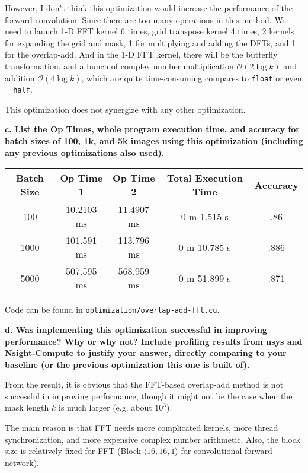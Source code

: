 \documentclass[12pt]{article}
\begin{document}
However, I don't think this optimization would increase the performance of the forward convolution. Since there are too many operations in this method. We need to launch 1-D FFT kernel 6 times, grid transpose kernel 4 times, 2 kernels for expanding the grid and mask, 1 for multiplying and adding the DFTs, and 1 for the overlap-add. And in the 1-D FFT kernel, there will be the butterfly transformation, and a bunch of complex number multiplication $\mathcal O(2 \log k)$ and addition $\mathcal O(4 \log k)$, which are quite time-consuming compares to \texttt{float} or even \texttt{\_\_half}.

This optimization does not synergize with any other optimization.

\hfill \break
\noindent \textbf{c. \; List the Op Times, whole program execution time, and accuracy for batch sizes of 100, 1k, and 5k images using this optimization (including any previous optimizations also used).}
\hfill \break

\begin{table}[!ht]
\begin{longtable}{c|cccc} \toprule
Batch Size & Op Time 1 & Op Time 2 & Total Execution Time & Accuracy \\ \midrule
100  & 10.2103 ms & 11.4907 ms & 0 m 1.515 s & .86 \\
1000 & 101.591 ms & 113.796 ms & 0 m 10.785 s & .886 \\
5000 & 507.595 ms & 568.959 ms & 0 m 51.899 s & .871 \\
\bottomrule
\end{longtable}
\end{table}

Code can be found in \texttt{optimization/overlap-add-fft.cu}.

\hfill \break
\noindent \textbf{d. \; Was implementing this optimization successful in improving performance? Why or why not? Include profiling results from nsys and Nsight-Compute to justify your answer, directly comparing to your baseline (or the previous optimization this one is built of).}
\hfill \break

From the result, it is obvious that the FFT-based overlap-add method is not successful in improving performance, though it might not be the case when the mask length $k$ is much larger (e.g. about $10^3$).

The main reason is that FFT needs more complicated kernels, more thread synchronization, and more expensive complex number arithmetic. Also, the block size is relatively fixed for FFT (Block $\langle 16, 16, 1 \rangle$ for convolutional forward network).
\end{document}
